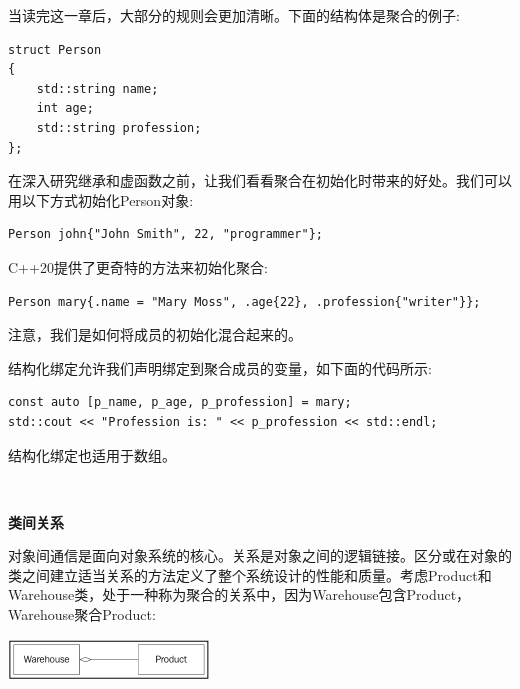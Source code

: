 当读完这一章后，大部分的规则会更加清晰。下面的结构体是聚合的例子: \par

\begin{lstlisting}[caption={}]
struct Person
{
	std::string name;
	int age;
	std::string profession;
};
\end{lstlisting}

在深入研究继承和虚函数之前，让我们看看聚合在初始化时带来的好处。我们可以用以下方式初始化Person对象: \par

\begin{lstlisting}[caption={}]
Person john{"John Smith", 22, "programmer"};
\end{lstlisting}

C++20提供了更奇特的方法来初始化聚合: \par

\begin{lstlisting}[caption={}]
Person mary{.name = "Mary Moss", .age{22}, .profession{"writer"}};
\end{lstlisting}

注意，我们是如何将成员的初始化混合起来的。 \par
结构化绑定允许我们声明绑定到聚合成员的变量，如下面的代码所示: \par

\begin{lstlisting}[caption={}]
const auto [p_name, p_age, p_profession] = mary;
std::cout << "Profession is: " << p_profession << std::endl;
\end{lstlisting}

结构化绑定也适用于数组。 \par

\noindent\textbf{}\ \par
\textbf{类间关系} \ \par
对象间通信是面向对象系统的核心。关系是对象之间的逻辑链接。区分或在对象的类之间建立适当关系的方法定义了整个系统设计的性能和质量。考虑Product和Warehouse类，处于一种称为聚合的关系中，因为Warehouse包含Product，Warehouse聚合Product:\par

\begin{center}
	\includegraphics[width=0.4\textwidth]{content/Section-1/Chapter-3/11}
\end{center}

